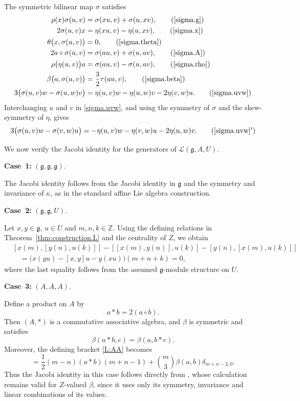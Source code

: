 \documentclass[12pt]{article}
\numberwithin{equation}{section}
\theoremstyle{definition}
\theoremstyle{plain}
\newcommand{\bZ}{\ensuremath{\mathbb{Z}}}
\newcommand{\afCase}[1]{\textbf{Case~#1:}}
\newcommand{\fg}{\mathfrak{g}}
\newcommand{\cL}{\ensuremath{\mathcal{L}}}
\begin{document}
The symmetric bilinear map $\sigma$ satisfies
\allowdisplaybreaks[4]
\begin{align}
    \rho(x)\sigma(u,v)&=\sigma(xu,v)+\sigma(u,xv),\tag{\ref{sigma.g}}\\
    2\sigma(u,v)x&=\eta(xu,v)-\eta(u,xv),\tag{\ref{sigma.x}}\\
    \theta\big(x,\sigma(u,v)\big)&=0,\tag{\ref{sigma.theta}}\\
    2a\circ\sigma(u,v)&=\sigma(au,v)+\sigma(u,av),\tag{\ref{sigma.A}}\\
    \rho\big(\eta(u,v)\big)a&=\sigma(au,v)-\sigma(u,av),\tag{\ref{sigma.rho}}\\
    \beta\big(a,\sigma(u,v)\big)&=\frac32\tau(au,v),\tag{\ref{sigma.beta}}\\
    3\big(\sigma(u,v)w-\sigma(u,w)v\big)&=\eta(u,v)w-\eta(u,w)v-2\eta(v,w)u.\tag{\ref{sigma.uvw}}
\end{align}
Interchanging $u$ and $v$ in \eqref{sigma.uvw}, and using the symmetry of $\sigma$ and the skew-symmetry of $\eta$, gives
\begin{equation}\label{sigma.uvw'}
    3\big(\sigma(u,v)w-\sigma(v,w)u\big)=-\eta(u,v)w-\eta(v,w)u-2\eta(u,w)v.\tag{\ref{sigma.uvw}$'$}
\end{equation}

We now verify the Jacobi identity for the generators of $\cL(\fg,A,U)$.


\afCase{1} $(\fg,\fg,\fg)$.

The Jacobi identity follows from the Jacobi identity in $\fg$ and the symmetry and invariance of $\kappa$, as in the standard affine Lie algebra construction.

\afCase{2} $(\fg,\fg,U)$.

Let $x,y\in\fg$, $u\in U$ and $m,n,k\in\bZ$. Using the defining relations in Theorem~\ref{thm:construction.L} and the centrality of $Z$, we obtain
\begin{align*}
    &[x(m),[y(n),u(k)]]-[[x(m),y(n)],u(k)]-[y(n),[x(m),u(k)]]\\
    &\quad=\big(x(yu)-[x,y]u-y(xu)\big)(m+n+k)=0,
\end{align*}
where the last equality follows from the assumed $\fg$-module structure on $U$.

\afCase{3} $(A,A,A)$.

Define a product on $A$ by
\begin{equation*}
    a*b=2(a\circ b).
\end{equation*}
Then $(A,*)$ is a commutative associative algebra, and $\beta$ is symmetric and satisfies
\begin{equation*}
    \beta(a*b,c)=\beta(a,b*c).
\end{equation*}
Moreover, the defining bracket \eqref{L:AA} becomes
\begin{equation*}
    [a(m),b(n)]=\frac12(m-n)(a*b)(m+n-1)+\binom{m}{3}\beta(a,b)\delta_{m+n-2,0}.
\end{equation*}
Thus the Jacobi identity in this case follows directly from \cite[proof of Theorem~4.1, Case~1]{LY}, whose calculation remains valid for $Z$-valued $\beta$, since it uses only its symmetry, invariance and linear combinations of its values.
\end{document}
